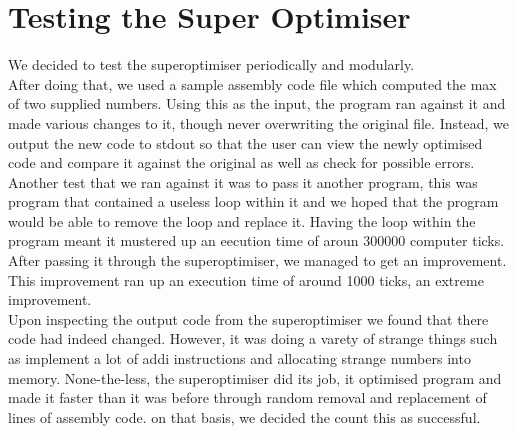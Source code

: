 \documentclass[11pt]{article}
\begin{document}
\section{Testing the Super Optimiser}
\indent We decided to test the superoptimiser periodically and modularly. 
\\After doing that, we used a sample assembly code file which computed the max of two supplied numbers. Using this as the input, the program ran against it and made various changes to it, though never overwriting the original file. Instead, we output the new code to stdout so that the user can view the newly optimised code and compare it against the original as well as check for possible errors.  
\indent Another test that we ran against it was to pass it another program, this was  program that contained a useless loop within it and we hoped that the program would be able to remove the loop and replace it. Having the loop within the program meant it mustered up an eecution time of aroun 300000 computer ticks. After passing it through the superoptimiser, we managed to get an improvement. This improvement ran up an execution time of around 1000 ticks, an extreme improvement. 
\\
\indent Upon inspecting the output code from the superoptimiser we found that there code had indeed changed. However, it was doing a varety of strange things such as implement a lot of addi instructions and allocating strange numbers into memory. None-the-less, the superoptimiser did its job, it optimised  program and made it faster than it was before through random removal and replacement of lines of assembly code. on that basis, we decided the count this as successful.
\end{document}
